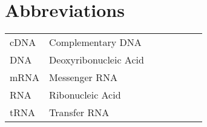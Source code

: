 \chapter*{Abbreviations}

\begin{flushleft}
\begin{tabular}{l p{0.8\linewidth}}
cDNA      & Complementary DNA\\
DNA       & Deoxyribonucleic Acid\\
mRNA      & Messenger RNA\\
RNA       & Ribonucleic Acid\\
tRNA      & Transfer RNA\\
\end{tabular}
\end{flushleft}

